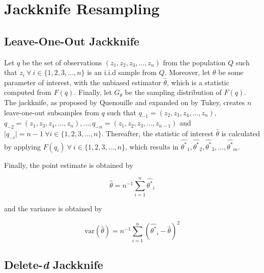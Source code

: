 \documentclass[
  letterpaper,
  DIV=11,
  numbers=noendperiod]{scrreprt}
\begin{document}
\hypertarget{jackknife-resampling}{%
\section{Jackknife Resampling}\label{jackknife-resampling}}

\hypertarget{sec-del}{%
\subsection{Leave-One-Out Jackknife}\label{sec-del}}

Let \(q\) be the set of observations
\(\left(z_1, z_2, z_3, \dots, z_n \right)\) from the population \(Q\)
such that \(z_i \ \forall \ i \in \{1, 2, 3, \dots, n\}\) is an i.i.d
sample from \(Q\). Moreover, let \(\theta\) be some parameter of
interest, with the unbiased estimator \(\hat{\theta}\), which is a
statistic computed from \(F(q)\). Finally, let \(G_{\theta}\) be the
sampling distribution of \(F(q)\). The jackknife, as proposed by
Quenouille and expanded on by Tukey, creates \(n\) leave-one-out
subsamples from \(q\) such that
\(q_{-1} = \left(z_2, z_3, z_4, \dots, z_n \right),\)
\(q_{-2} = \left(z_1, z_3, z_4, \dots, z_n \right), \dots, q_{-n} = \left(z_1, z_2, z_3, \dots, z_{n-1} \right)\)
and \(\lvert q_{-i}\rvert = n-1 \ \forall i \in \{1, 2, 3, \dots, n\}\).
Thereafter, the statistic of interest \(\hat{\theta}\) is calculated by
applying \(F(q_i) \ \forall \ i \in \{1, 2, 3, \dots, n\}\), which
results in
\(\hat{\theta^*}_1, \hat{\theta^*}_2, \hat{\theta^*}_3, \dots, \hat{\theta^*}_m\).

Finally, the point estimate is obtained by

\[
\hat{\theta} = n^{-1}\sum^n_{i = 1} \hat{\theta^*}_i
\]

and the variance is obtained by

\[
\text{var}(\hat{\theta}) = n^{-1}\sum^n_{i = 1} \left(\hat{\theta^*}_i - \hat{\theta}\right)^2
\]

\hypertarget{delete-d-jackknife}{%
\subsection{\texorpdfstring{Delete-\emph{d}
Jackknife}{Delete-d Jackknife}}\label{delete-d-jackknife}}
\end{document}
